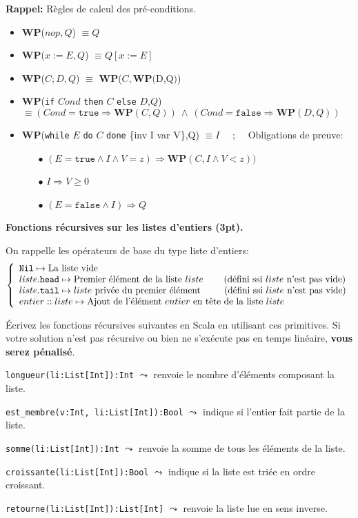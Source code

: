 \documentclass[10pt]{article}\usepackage[nu]{esial}
\newcommand{\WP}[1]{\textbf{WP}($#1$)}
\begin{document}
\medskip\noindent\textbf{Rappel:} Règles de calcul des pré-conditions.

\begin{itemize}
\item \WP{nop, Q}  $\equiv Q$
\item \WP{x:=E, Q} $\equiv Q[x:=E]$
\item \WP{C;D, Q}  $\equiv$ \WP{C, \WP{D,Q}}
\item \textbf{WP}(\texttt{if} $Cond$ \texttt{then} $C$ \texttt{else} $D$,$Q$)
  $\equiv (Cond=\mathtt{true}\Rightarrow \mathbf{WP}(C,Q))~\wedge~
          (Cond=\mathtt{false}\Rightarrow \mathbf{WP}(D,Q))$
\item \textbf{WP}(\texttt{while} $E$ \texttt{do} $C$ \texttt{done} \{inv I var
  V\},Q)  $\equiv I$ ~~;~~  Obligations de preuve:
  \begin{enumerate}
  \item[$\bullet$] $(E=\mathtt{true}\wedge I\wedge V=z) \Rightarrow
    \mathbf{WP}(C,I\wedge V<z))$
  \item[$\bullet$] $I\Rightarrow V\geq 0$
  \item[$\bullet$] $(E=\mathtt{false}\wedge I) \Rightarrow Q$
  \end{enumerate}
\end{itemize}

\bigskip
\Exercice \textbf{Fonctions récursives sur les listes d'entiers (3pt).}

On rappelle les opérateurs de base du type liste d'entiers:
$$\left\{
\begin{array}{l}
  \mathtt{Nil}  \mapsto \text{La liste vide}\\
  liste\mathtt{.head} \mapsto \text{Premier élément de la liste } liste
    \;\;\;\;\;\;\;\;\text{(défini ssi } liste \text{ n'est pas vide)}\\
  liste\mathtt{.tail} \mapsto liste \text{ privée du premier élément}
    \text{\hspace{9mm}(défini ssi } liste \text{ n'est pas vide)}\\
  entier \;\mathtt{::}\; liste \mapsto \text{Ajout de l'élément } entier 
    \text{ en tête de la liste } liste
\end{array}\right.
$$

Écrivez les fonctions récursives suivantes en Scala en utilisant ces primitives. 
Si votre solution n'est pas récursive ou bien ne s'exécute pas en temps linéaire,
\textbf{vous serez pénalisé}.

\Question %
\texttt{longueur(li:List[Int]):Int} $\leadsto$ 
renvoie le nombre d'éléments composant la liste.

\Question %
\texttt{est\_membre(v:Int, li:List[Int]):Bool} $\leadsto$ 
indique si l'entier fait partie de la liste.

\Question %
\texttt{somme(li:List[Int]):Int} $\leadsto$ 
renvoie la somme de tous les éléments de la liste.

\Question %
\texttt{croissante(li:List[Int]):Bool} $\leadsto$
indique si la liste est triée en ordre croissant.

\Question %
\texttt{retourne(li:List[Int]):List[Int]} $\leadsto$
renvoie la liste lue en sens inverse.
\end{document}
